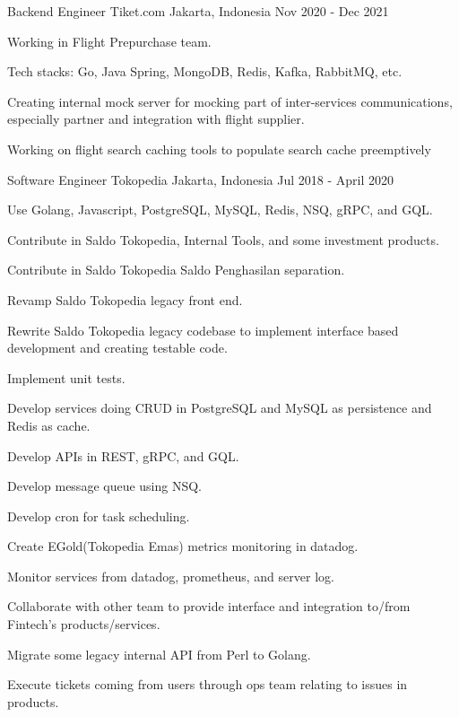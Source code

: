 \begin{cventries}

\cventry
    {Backend Engineer}
    {Tiket.com}
    {Jakarta, Indonesia}
    {Nov 2020 - Dec 2021}
    {
        \begin{cvitems}
            \item {Working in Flight Prepurchase team.}
            \item {Tech stacks: Go, Java Spring, MongoDB, Redis, Kafka, RabbitMQ, etc.}
            \item {Creating internal mock server for mocking part of inter-services communications, especially partner and integration with flight supplier.}
            \item {Working on flight search caching tools to populate search cache preemptively}
        \end{cvitems}
    }

\cventry
    {Software Engineer}
    {Tokopedia}
    {Jakarta, Indonesia}
    {Jul 2018 - April 2020}
    {
        \begin{cvitems}
            \item {Use Golang, Javascript, PostgreSQL, MySQL, Redis, NSQ, gRPC, and GQL.}
            \item {Contribute in Saldo Tokopedia, Internal Tools, and some investment products.}
            \item {Contribute in Saldo Tokopedia Saldo Penghasilan separation.}
            \item {Revamp Saldo Tokopedia legacy front end.}
            \item {Rewrite Saldo Tokopedia legacy codebase to implement interface based development and creating testable code.}
            \item {Implement unit tests.}
            \item {Develop services doing CRUD in PostgreSQL and MySQL as persistence and Redis as cache.}
            \item {Develop APIs in REST, gRPC, and GQL.}
            \item {Develop message queue using NSQ.}
            \item {Develop cron for task scheduling.}
            \item {Create EGold(Tokopedia Emas) metrics monitoring in datadog.}
            \item {Monitor services from datadog, prometheus, and server log.}
            \item {Collaborate with other team to provide interface and integration to/from Fintech’s products/services.}
            \item {Migrate some legacy internal API from Perl to Golang.}
            \item {Execute tickets coming from users through ops team relating to issues in products.}
        \end{cvitems}
    }


\end{cventries}
